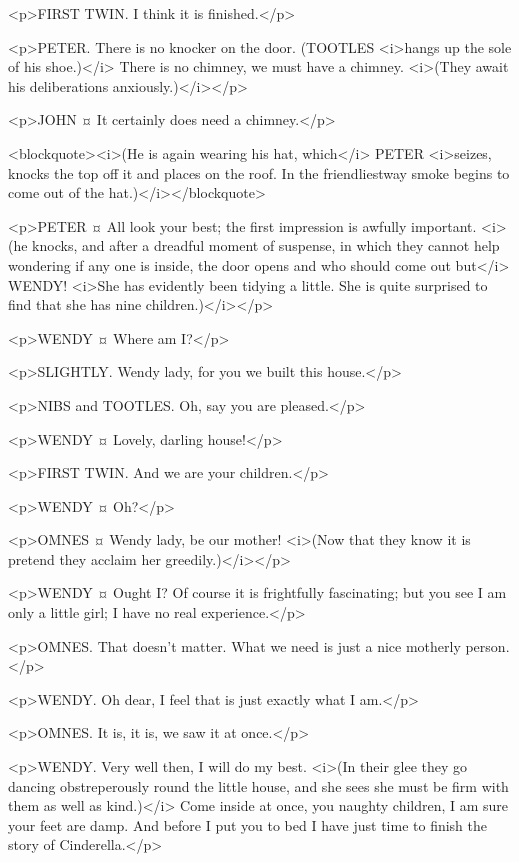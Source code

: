 <p>FIRST TWIN. I think it is finished.</p>

<p>PETER. There is no knocker on the door. (TOOTLES <i>hangs up the sole of his shoe.)</i> There is no chimney, we must have a chimney. <i>(They await his deliberations anxiously.)</i></p>

<p>JOHN ¤
It certainly does need a chimney.</p>

<blockquote><i>(He is again wearing his hat, which</i> PETER <i>seizes, knocks the top off it and places on the roof. In the friendliestway smoke begins to come out of the hat.)</i></blockquote>

<p>PETER ¤
All look your best; the first impression is awfully important. <i>(he knocks, and after a dreadful moment of suspense, in which they cannot help wondering if any one is inside, the door opens and who should come out but</i> WENDY! <i>She has evidently been tidying a little. She is quite surprised to find that she has nine children.)</i></p>

<p>WENDY ¤
Where am I?</p>

<p>SLIGHTLY. Wendy lady, for you we built this house.</p>

<p>NIBS and TOOTLES. Oh, say you are pleased.</p>

<p>WENDY ¤
Lovely, darling house!</p>

<p>FIRST TWIN. And we are your children.</p>

<p>WENDY ¤
Oh?</p>

<p>OMNES ¤
Wendy lady, be our mother! <i>(Now that they know it is pretend they acclaim her greedily.)</i></p>

<p>WENDY ¤
Ought I? Of course it is frightfully fascinating; but you see I am only a little girl; I have no real experience.</p>

<p>OMNES. That doesn't matter. What we need is just a nice motherly person.</p>

<p>WENDY. Oh dear, I feel that is just exactly what I am.</p>

<p>OMNES. It is, it is, we saw it at once.</p>

<p>WENDY. Very well then, I will do my best. <i>(In their glee they go dancing obstreperously round the little house, and she sees she must be firm with them as well as kind.)</i> Come inside at once, you naughty children, I am sure your feet are damp. And before I put you to bed I have just time to finish the story of Cinderella.</p>

